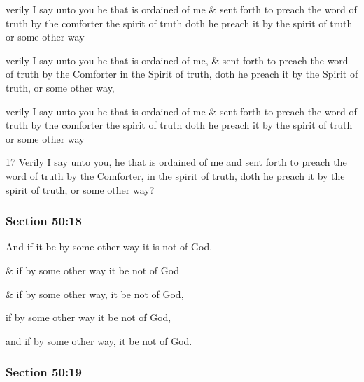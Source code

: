 		\begin{framed}
		\scriptsize
			\begin{compactdesc}
				\item[JSP] verily I say unto you he that is ordained of me \& sent forth to preach the word of truth by the comforter the spirit of truth doth he preach it by the spirit of truth or some other way
				\item[Gilbert] verily I say unto you he that is ordained of me, \& sent forth to preach the word of truth by the Comforter in the Spirit of truth, doth he preach it by the Spirit of truth, or some other way,
				\item[Hyde and Smith] verily I say unto you he that is ordained of me \& sent forth to preach the word of truth by the comforter the spirit of truth doth he preach it by the spirit of truth or some other way
				\item[BC] 17 Verily I say unto you, he that is ordained of me and sent forth to preach the word of truth by the Comforter, in the spirit of truth, doth he preach it by the spirit of truth, or some other way? 
			\end{compactdesc}
		\end{framed}

	\subsubsection{Section 50:18} %
		\label{DC50-18}

		And if it be by some other way it is not of God.

		\begin{framed}
		\scriptsize
			\begin{compactdesc}
				\item[JSP] \& if by some other way it be not of God
				\item[Gilbert] \& if by some other way, it be not of God,
				\item[Hyde and Smith] if by some other way it be not of God,
				\item[BC] and if by some other way, it be not of God.
			\end{compactdesc}
		\end{framed}

	\subsubsection{Section 50:19} %
		\label{DC50-19}

